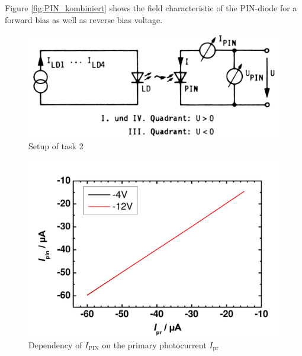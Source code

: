 Figure \ref{fig:PIN_kombiniert} shows the field characteristic of the PIN-diode for a forward bias as well as reverse bias voltage.
 


\begin{figure}%
\centering
\includegraphics[width=.6\columnwidth]{Grafiken/T2_setup.jpg}%
\caption{Setup of task 2}%
\label{fig:T2_setup}%
\end{figure}

\begin{figure}%
\centering
\includegraphics[width=.6\columnwidth]{Grafiken/linearity.pdf}%
\caption{Dependency of $I_{\mathrm{PIN}}$ on the primary photocurrent $I_{\mathrm{pr}}$}%
\label{fig:linearity}%
\end{figure}

